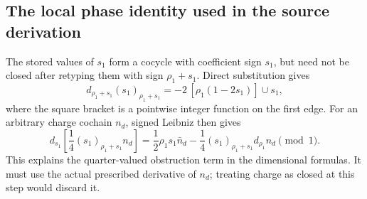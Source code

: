 \subsection{The local phase identity used in the source derivation}
The stored values of $s_1$ form a cocycle with coefficient sign $s_1$, but need not be closed after retyping them with sign $\rho_1+s_1$. Direct substitution gives
\begin{equation}\label{eq:s1-retyping}
 d_{\rho_1+s_1}(s_1)_{\rho_1+s_1}
 =-2\,[\rho_1(1-2s_1)]\cup s_1,
\end{equation}
where the square bracket is a pointwise integer function on the first edge. For an arbitrary charge cochain $n_d$, signed Leibniz then gives
\begin{equation}\label{eq:phase-shift-general}
 d_{s_1}\left[\frac14(s_1)_{\rho_1+s_1}n_d\right]
 =\frac12\rho_1s_1\bar n_d
 -\frac14(s_1)_{\rho_1+s_1}d_{\rho_1}n_d\pmod1.
\end{equation}
This explains the quarter-valued obstruction term in the dimensional formulas. It must use the actual prescribed derivative of $n_d$; treating charge as closed at this step would discard it.
